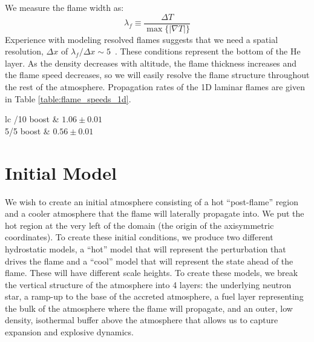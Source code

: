 \documentclass[preprint,times,tighten]{aastex63}
\begin{document}
We measure the flame width as:
\begin{equation}
\lambda_f \equiv \frac{\Delta T}{\max\{|\nabla T|\}}
\end{equation}
Experience with modeling resolved flames suggests that we need a
spatial resolution, $\Delta x$ of $\lambda_f/\Delta x \sim 5$~\citep{SNld}.  These
conditions represent the bottom of the He layer.  As the density
decreases with altitude, the flame thickness increases and the flame
speed decreases, so we will easily resolve the flame structure throughout
the rest of the atmosphere. Propagation rates of the 1D laminar flames are given
in Table \ref{table:flame_speeds_1d}.

\begin{deluxetable}{lc}
	/10 boost & $1.06 \pm 0.01$ \\
	5/5 boost & $0.56 \pm 0.01$ \\
	\enddata
\end{deluxetable}

\section{Initial Model}\label{Sec:inital_model}


We wish to create an initial atmosphere consisting of a hot
``post-flame'' region and a cooler atmosphere that the flame will
laterally propagate into.  We put the hot region at the very left of
the domain (the origin of the axisymmetric coordinates).  To create
these initial conditions, we produce two different hydrostatic models,
a ``hot'' model that will represent the perturbation that drives the
flame and a ``cool'' model that will represent the state ahead of the
flame.  These will have different scale heights.  To create these
models, we break the vertical structure of the atmosphere into 4
layers: the underlying neutron star, a ramp-up to the base of the
accreted atmosphere, a fuel layer representing the bulk of the
atmosphere where the flame will propagate, and an outer, low density,
isothermal buffer above the atmosphere that allows us
to capture expansion and explosive dynamics.  
\end{document}
